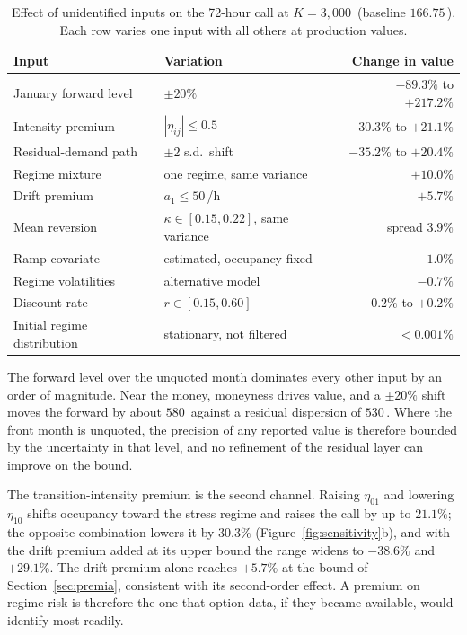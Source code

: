 \begin{table}[htbp]
\centering
\caption{Effect of unidentified inputs on the 72-hour call at
$K=3{,}000$\,\TRY{} (baseline $166.75$\,\TRY). Each row varies one input with
all others at production values.}
\label{tab:sensitivity}
\small
\setlength{\tabcolsep}{5pt}
\begin{tabular}{@{}llr@{}}
\toprule
Input & Variation & Change in value \\
\midrule
January forward level & $\pm20\%$ & $-89.3\%$ to $+217.2\%$ \\
Intensity premium & $|\eta_{ij}|\le0.5$ & $-30.3\%$ to $+21.1\%$ \\
Residual-demand path & $\pm2$ s.d.\ shift & $-35.2\%$ to $+20.4\%$ \\
Regime mixture & one regime, same variance & $+10.0\%$ \\
Drift premium & $a_1\le50$\,\TRY{}/h & $+5.7\%$ \\
Mean reversion & $\kappa\in[0.15,0.22]$, same variance & spread $3.9\%$ \\
Ramp covariate & estimated, occupancy fixed & $-1.0\%$ \\
Regime volatilities & alternative model & $-0.7\%$ \\
Discount rate & $r\in[0.15,0.60]$ & $-0.2\%$ to $+0.2\%$ \\
Initial regime distribution & stationary, not filtered & $<0.001\%$ \\
\bottomrule
\end{tabular}
\end{table}

The forward level over the unquoted month dominates every other input by an
order of magnitude. Near the money, moneyness drives value, and a $\pm20\%$
shift moves the forward by about $580$\,\TRY{} against a residual dispersion of
$530$\,\TRY. Where the front month is unquoted, the precision of any reported
value is therefore bounded by the uncertainty in that level, and no refinement
of the residual layer can improve on the bound.

The transition-intensity premium is the second channel. Raising $\eta_{01}$
and lowering $\eta_{10}$ shifts occupancy toward the stress regime and raises
the call by up to $21.1\%$; the opposite combination lowers it by $30.3\%$
(Figure~\ref{fig:sensitivity}b), and with the drift premium added at its upper
bound the range widens to $-38.6\%$ and $+29.1\%$. The drift premium alone
reaches $+5.7\%$ at the bound of Section~\ref{sec:premia}, consistent with its
second-order effect. A premium on regime risk is therefore the one that option
data, if they became available, would identify most readily.

